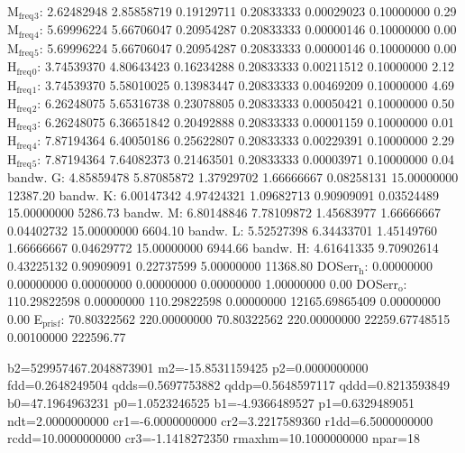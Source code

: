 \documentclass[11pt]{article}
\begin{document}
M\(_{\text{freq}}\)\(_{\text{3}}\):   2.62482948   2.85858719   0.19129711   0.20833333   0.00029023   0.10000000         0.29
M\(_{\text{freq}}\)\(_{\text{4}}\):   5.69996224   5.66706047   0.20954287   0.20833333   0.00000146   0.10000000         0.00
M\(_{\text{freq}}\)\(_{\text{5}}\):   5.69996224   5.66706047   0.20954287   0.20833333   0.00000146   0.10000000         0.00
H\(_{\text{freq}}\)\(_{\text{0}}\):   3.74539370   4.80643423   0.16234288   0.20833333   0.00211512   0.10000000         2.12
H\(_{\text{freq}}\)\(_{\text{1}}\):   3.74539370   5.58010025   0.13983447   0.20833333   0.00469209   0.10000000         4.69
H\(_{\text{freq}}\)\(_{\text{2}}\):   6.26248075   5.65316738   0.23078805   0.20833333   0.00050421   0.10000000         0.50
H\(_{\text{freq}}\)\(_{\text{3}}\):   6.26248075   6.36651842   0.20492888   0.20833333   0.00001159   0.10000000         0.01
H\(_{\text{freq}}\)\(_{\text{4}}\):   7.87194364   6.40050186   0.25622807   0.20833333   0.00229391   0.10000000         2.29
H\(_{\text{freq}}\)\(_{\text{5}}\):   7.87194364   7.64082373   0.21463501   0.20833333   0.00003971   0.10000000         0.04
bandw. G:   4.85859478   5.87085872   1.37929702   1.66666667   0.08258131  15.00000000     12387.20
bandw. K:   6.00147342   4.97424321   1.09682713   0.90909091   0.03524489  15.00000000      5286.73
bandw. M:   6.80148846   7.78109872   1.45683977   1.66666667   0.04402732  15.00000000      6604.10
bandw. L:   5.52527398   6.34433701   1.45149760   1.66666667   0.04629772  15.00000000      6944.66
bandw. H:   4.61641335   9.70902614   0.43225132   0.90909091   0.22737599   5.00000000     11368.80
DOSerr\(_{\text{h}}\):   0.00000000   0.00000000   0.00000000   0.00000000   0.00000000   1.00000000         0.00
DOSerr\(_{\text{o}}\): 110.29822598   0.00000000 110.29822598   0.00000000 12165.69865409   0.00000000         0.00
E\(_{\text{pris}}\)\(_{\text{f}}\):  70.80322562 220.00000000  70.80322562 220.00000000 22259.67748515   0.00100000    222596.77

b2=529957467.2048873901 m2=-15.8531159425 p2=0.0000000000 fdd=0.2648249504 qdds=0.5697753882 qddp=0.5648597117 qddd=0.8213593849 b0=47.1964963231 p0=1.0523246525 b1=-4.9366489527 p1=0.6329489051 ndt=2.0000000000 cr1=-6.0000000000 cr2=3.2217589360 r1dd=6.5000000000 rcdd=10.0000000000 cr3=-1.1418272350 rmaxhm=10.1000000000 npar=18 
\end{document}
